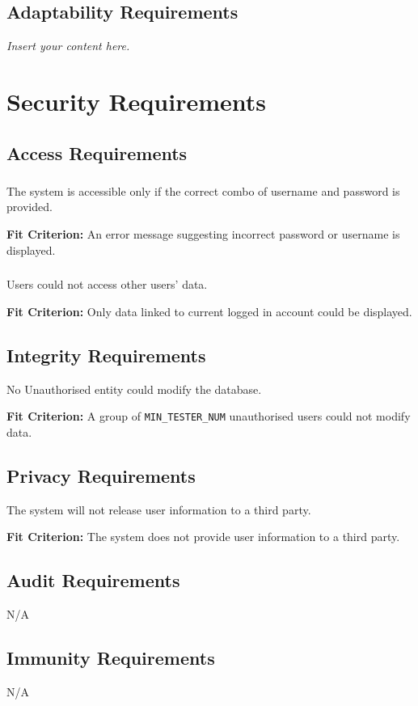\documentclass[12pt]{article}
\newcommand{\lips}{\textit{Insert your content here.}}
\begin{document}
\subsection{Adaptability Requirements}
\lips

\section{Security Requirements}
\subsection{Access Requirements}
\subsubsection{}
The system is accessible only if the correct combo of username and password is provided.

\textbf{Fit Criterion:} An error message suggesting incorrect password or username is displayed.
\subsubsection{}
Users could not access other users' data.

\textbf{Fit Criterion:} Only data linked to current logged in account could be displayed.
\subsection{Integrity Requirements}
No Unauthorised entity could modify the database.

\textbf{Fit Criterion:} A group of \texttt{MIN\_TESTER\_NUM} unauthorised users could not modify data.
\subsection{Privacy Requirements}

The system will not release user information to a third party.

\textbf{Fit Criterion:} The system does not provide user information to a third party.
\subsection{Audit Requirements}
N/A
\subsection{Immunity Requirements}
N/A
\end{document}
